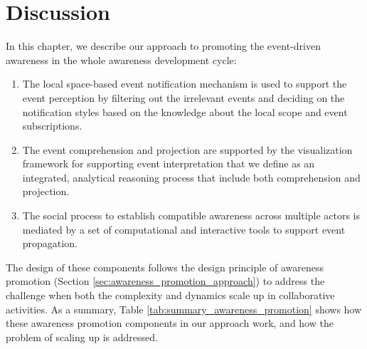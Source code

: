\section{Discussion} %
\label{sec:discussion}
In this chapter, we describe our approach to promoting the event-driven awareness in the whole awareness development cycle:

\begin{enumerate}
	\item The local space-based event notification mechanism is used to support the event perception by filtering out the irrelevant events and deciding on the notification styles based on the knowledge about the local scope and event subscriptions.
	\item The event comprehension and projection are supported by the visualization framework for supporting event interpretation that we define as an integrated, analytical reasoning process that include both comprehension and projection.
	\item The social process to establish compatible awareness across multiple actors is mediated by a set of computational and interactive tools to support event propagation.
\end{enumerate}

The design of these components follows the design principle of awareness promotion (Section \ref{sec:awareness_promotion_approach}) to address the challenge when both the complexity and dynamics scale up in collaborative activities. As a summary, Table \ref{tab:summary_awareness_promotion} shows how these awareness promotion components in our approach work, and how the problem of scaling up is addressed.


